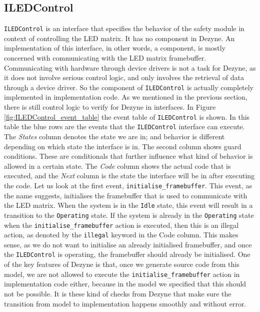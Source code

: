 \documentclass[12pt]{scrreprt}
\begin{document}
\subsection{ILEDControl}
\texttt{ILEDControl} is an interface that specifies the behavior of the safety module in context of controlling the LED matrix. It has no component in Dezyne. An implementation of this interface, in other words, a component, is mostly concerned with communicating with the LED matrix framebuffer. Communicating with hardware through device drivers is not a task for Dezyne, as it does not involve serious control logic, and only involves the retrieval of data through a device driver. So the component of \texttt{ILEDControl} is actually completely implemented in implementation code. As we mentioned in the previous section, there is still control logic to verify for Dezyne in interfaces. In Figure \ref{fig:ILEDControl_event_table} the event table of \texttt{ILEDControl} is shown. In this table the blue rows are the events that the \texttt{ILEDControl} interface can execute. The \textit{States} column denotes the state we are in; and behavior is different depending on which state the interface is in. The second column shows guard conditions. These are conditionals that further influence what kind of behavior is allowed in a certain state. The \textit{Code} column shows the actual code that is executed, and the \textit{Next} column is the state the interface will be in after executing the code. Let us look at the first event, \texttt{initialise\_framebuffer}. This event, as the name suggests, initialises the framebuffer that is used to communicate with the LED matrix. When the system is in the \texttt{Idle} state, this event will result in a transition to the \texttt{Operating} state. If the system is already in the \texttt{Operating} state when the \texttt{initialise\_framebuffer} action is executed, then this is an illegal action, as denoted by the \texttt{illegal} keyword in the Code column. This makes sense, as we do not want to initialise an already initialised framebuffer, and once the \texttt{ILEDControl} is operating, the framebuffer should already be initialised. One of the key features of Dezyne is that, once we generate source code from this model, we are not allowed to execute the \texttt{initialise\_framebuffer} action in implementation code either, because in the model we specified that this should not be possible. It is these kind of checks from Dezyne that make sure the transition from model to implementation happens smoothly and without error. \par
\end{document}
